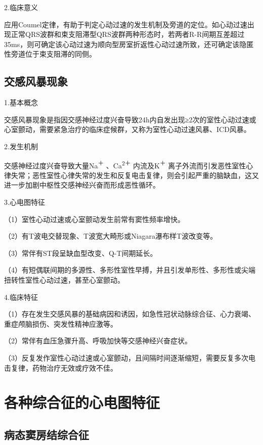 2.临床意义

应用Coumel定律，有助于判定心动过速的发生机制及旁道的定位。如心动过速出现正常QRS波群和束支阻滞型QRS波群两种形态时，若两者R-R间期互差超过35ms，则可确定该心动过速为顺向型房室折返性心动过速所致，还可确定该隐匿性旁道位于束支阻滞的同侧。

\protect\hypertarget{text00047.htmlux5cux23subid548}{}{}

\subsection{交感风暴现象}

1.基本概念

交感风暴现象是指因交感神经过度兴奋导致24h内自发出现≥2次的室性心动过速或心室颤动，需要紧急治疗的临床症候群，又称为室性心动过速风暴、ICD风暴。

2.发生机制

交感神经过度兴奋导致大量Na\textsuperscript{＋} 、Ca\textsuperscript{2＋}
内流及K\textsuperscript{＋}
离子外流而引发恶性室性心律失常；恶性室性心律失常的发生和反复电击复律，则会引起严重的脑缺血，这又进一步加剧中枢性交感神经兴奋而形成恶性循环。

3.心电图特征

（1）室性心动过速或心室颤动发生前常有窦性频率增快。

（2）有T波电交替现象、T波宽大畸形或Niagara瀑布样T波改变等。

（3）常伴有ST段呈缺血型改变、Q-T间期延长。

（4）有短偶联间期的多源性、多形性室性早搏，并且引发单形性、多形性或尖端扭转性室性心动过速，甚至心室颤动。

4.临床特征

（1）存在发生交感风暴的基础病因和诱因，如急性冠状动脉综合征、心力衰竭、重症颅脑损伤、突发性精神应激等。

（2）常伴有血压急骤升高、呼吸加快等交感神经兴奋症状。

（3）反复发作室性心动过速或心室颤动，且间隔时间逐渐缩短，需要反复多次电击复律，药物治疗无效或疗效不佳。

\protect\hypertarget{text00047.htmlux5cux23subid549}{}{}

\section{各种综合征的心电图特征}

\protect\hypertarget{text00047.htmlux5cux23subid550}{}{}

\subsection{病态窦房结综合征}


